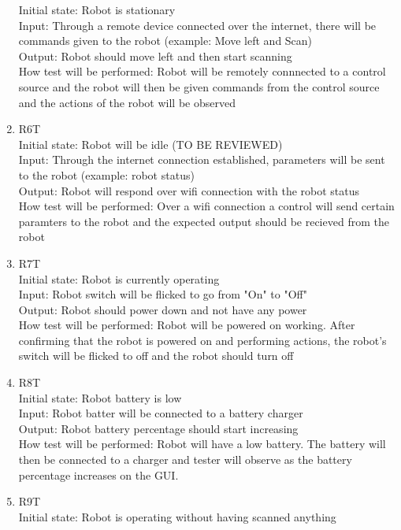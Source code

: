 \documentclass[12pt, titlepage]{article}
\begin{document}
\begin{enumerate}
Initial state: Robot is stationary \\
Input: Through a remote device connected over the internet, there will be commands given to the robot (example: Move left and Scan) \\
Output: Robot should move left and then start scanning  \\
How test will be performed: Robot will be remotely connnected to a control source and the robot will then be given commands from the control source and the actions of the robot will be observed \\
\item{R6T\\}
Initial state: Robot will be idle (TO BE REVIEWED) \\
Input: Through the internet connection established, parameters will be sent to the robot (example: robot status) \\
Output: Robot will respond over wifi connection with the robot status  \\
How test will be performed: Over a wifi connection a control will send certain paramters to the robot and the expected output should be recieved from the robot \\
\item{R7T\\}
Initial state: Robot is currently operating \\
Input: Robot switch will be flicked to go from "On" to "Off"\\
Output: Robot should power down and not have any power \\
How test will be performed: Robot will be powered on working. After confirming that the robot is powered on and performing actions, the robot's switch will be flicked to off and the robot should turn off \\
\item{R8T\\}
Initial state: Robot battery is low \\
Input: Robot batter will be connected to a battery charger \\
Output: Robot battery percentage should start increasing \\
How test will be performed: Robot will have a low battery. The battery will then be connected to a charger and tester will observe as the battery percentage increases on the GUI.\\
\item{R9T\\}
Initial state: Robot is operating without having scanned anything \\

\end{enumerate}
\end{document}
